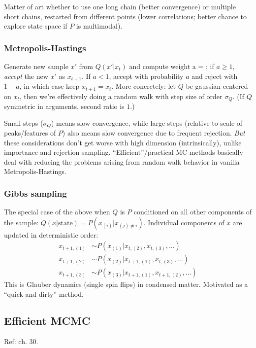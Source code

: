 \documentclass[notitlepage,openany,11pt]{report}
\theoremstyle{plain}%
\numberwithin{equation}{section}
\begin{document}
Matter of art whether to use one long chain (better convergence) or multiple short chains, restarted from different points (lower correlations; better chance to explore state space if $P$ is multimodal). 

\subsubsection{Metropolis-Hastings}
Generate new sample $x'$ from $Q(x' | x_t)$ and compute weight
\be
a =  ;
\ee
if $a \geq 1$, \emph{accept} the new $x'$ as $x_{t+1}$. If $a < 1$, accept with probability $a$ and reject with $1-a$, in which case keep $x_{t+1} = x_{t}.$ 
More concretely: let $Q$ be gaussian centered on $x_t$, then we're effectively doing a random walk with step size of order $\sigma_{Q}$. (If $Q$ symmetric in arguments, second ratio is $1$.)

Small steps ($\sigma_{Q}$) means slow convergence, while large steps (relative to scale of peaks/features of $P$) also means slow convergence due to frequent rejection.  \emph{But} these considerations don't get worse with high dimension (intrinsically), unlike importance and rejection sampling. ``Efficient''/practical MC methods basically deal with reducing the problems arising from random walk behavior in vanilla Metropolis-Hastings.

\subsubsection{Gibbs sampling} The special case of the above when $Q$ is $P$ conditioned on all other components of the sample: $Q(x | \text{state}) = P(x_{(i)} | x_{(j) \neq i})$. Individual components of $x$ are updated in deterministic order:
\begin{align*}
x_{t+1, (1)} &\sim P(x_{(1)} | x_{t, (2)}, x_{t, (3)}, \ldots) \\
x_{t+1, (2)} &\sim P(x_{(2)} | x_{t+1, (1)}, x_{t, (3)}, \ldots) \\
x_{t+1, (3)} &\sim P(x_{(3)} | x_{t+1, (1)}, x_{t+1, (2)}, \ldots)
\end{align*}
This is Glauber dynamics (single spin flips) in condensed matter. Motivated as a ``quick-and-dirty'' method.

\subsection{Efficient MCMC} Ref: \cite{MacKay:03} ch. 30.
\end{document}

